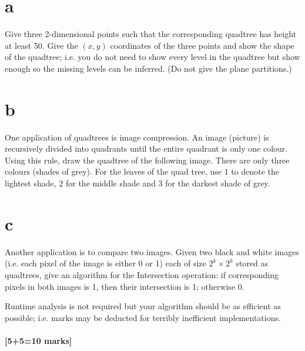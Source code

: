 \documentclass[12pt]{article}
\begin{document}
	\begin{itemize}
		\part{a} Give three 2-dimensional points such that the corresponding quadtree has height at least 50.
		Give the $(x,y)$ coordinates of the three points and show the shape of the quadtree; i.e. you do not need to show every level in the quadtree but show enough so the missing levels can be inferred. (Do not give the plane partitions.)
		
		\part{b} One application of quadtrees is image compression.  An image (picture) is recursively
		divided into quadrants until the entire quadrant is only one colour.  Using this rule, draw the quadtree
		of the following image.  There are only three colours (shades of grey). For the leaves of the quad tree,
		use 1 to denote the lightest shade, 2 for the middle shade and 3 for the darkest shade of grey.
		
		
		\part{c} Another application is to compare two images.  Given two black and white images (i.e. each pixel of the image is either 0 or 1)
		each of size $2^k \times 2^k$ stored as quadtrees, give an algorithm for the Intersection operation: if corresponding pixels in both images is 1, then their intersection is 1; otherwise 0.
		
		Runtime analysis is not required but your algorithm should be as efficient as possible; i.e. marks may be deducted for terribly inefficient implementations.
		
	\end{itemize}
	
	
	
	\subsection{[5+5=10 marks]}
	
\end{document}
